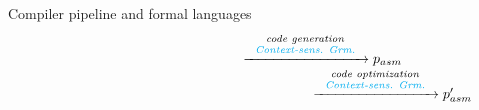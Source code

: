 \documentclass{beamer}
\begin{document}
\begin{frame}{Compiler pipeline and formal languages}
$$\begin{array}{lllll}
%
\quad \qquad \quad \qquad \qquad \qquad\qquad\qquad
\xrightarrow{
\scriptsize
\begin{tabular}{c}
\textit{code generation} \\
{\color{cyan}\textit{Context-sens. Grm.}}
\end{tabular}
}
p_{asm} \\
%
%
\quad \qquad \qquad \qquad \qquad \qquad \qquad\qquad\qquad\qquad
\xrightarrow{
\scriptsize
\begin{tabular}{c}
\textit{code optimization} \\
{\color{cyan}\textit{Context-sens. Grm.}}
\end{tabular}
} p'_{asm}
\end{array}
$$


\end{frame}

\end{document}
